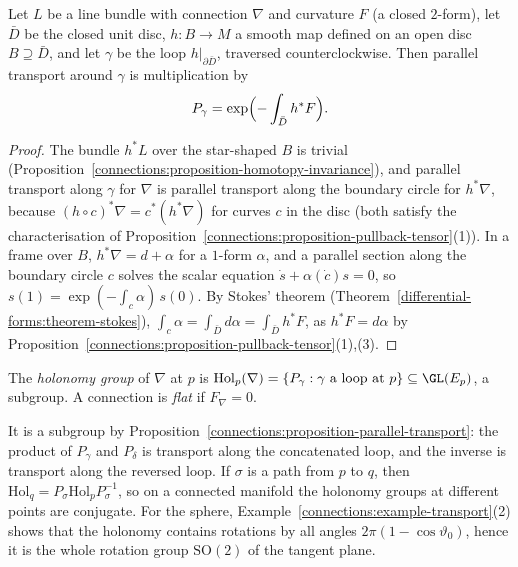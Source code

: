 \begin{proposition}\label{connections:proposition-line-holonomy}
Let $L$ be a line bundle with connection $\nabla$ and curvature $F$ (a closed $2$-form), let $\bar D$ be the closed unit disc, $h \colon B \to M$ a smooth map defined on an
open disc $B \supseteq \bar D$, and let $\gamma$ be the loop $h|_{\partial\bar D}$, traversed counterclockwise. Then parallel transport around $\gamma$ is multiplication by
\[
P_\gamma = \exp\Bigl(-\int_{\bar D}h^*F\Bigr).
\]
\end{proposition}

\begin{proof}
The bundle $h^*L$ over the star-shaped $B$ is trivial (Proposition~\ref{connections:proposition-homotopy-invariance}), and
parallel transport along $\gamma$ for $\nabla$ is parallel transport along the boundary circle for $h^*\nabla$, because $(h \circ c)^*\nabla = c^*(h^*\nabla)$ for curves $c$ in the
disc (both satisfy the characterisation of Proposition~\ref{connections:proposition-pullback-tensor}(1)). In a frame over $B$, $h^*\nabla = d + \alpha$ for a $1$-form $\alpha$, and a
parallel section along the boundary circle $c$ solves the scalar equation $\dot s + \alpha(\dot c)s = 0$, so $s(1) = \exp(-\int_c\alpha)\,s(0)$. By Stokes' theorem
(Theorem~\ref{differential-forms:theorem-stokes}), $\int_c\alpha = \int_{\bar D}d\alpha = \int_{\bar D}h^*F$, as $h^*F = d\alpha$ by
Proposition~\ref{connections:proposition-pullback-tensor}(1),(3).
\end{proof}

\begin{definition}\label{connections:definition-holonomy}
The \emph{holonomy group} of $\nabla$ at $p$ is $\mathrm{Hol}_p(\nabla) = \{P_\gamma : \gamma \text{ a loop at } p\} \subseteq \GL(E_p)$, a subgroup. A connection is \emph{flat} if $F_\nabla = 0$.
\end{definition}

It is a subgroup by Proposition~\ref{connections:proposition-parallel-transport}: the product of $P_\gamma$ and $P_\delta$ is transport along the concatenated loop, and the inverse is
transport along the reversed loop. If $\sigma$ is a path from $p$ to $q$, then $\mathrm{Hol}_q = P_\sigma\mathrm{Hol}_pP_\sigma^{-1}$, so on a connected manifold the holonomy groups at
different points are conjugate. For the sphere, Example~\ref{connections:example-transport}(2) shows that the holonomy contains rotations by all angles $2\pi(1 - \cos\vartheta_0)$,
hence it is the whole rotation group $\mathrm{SO}(2)$ of the tangent plane.

